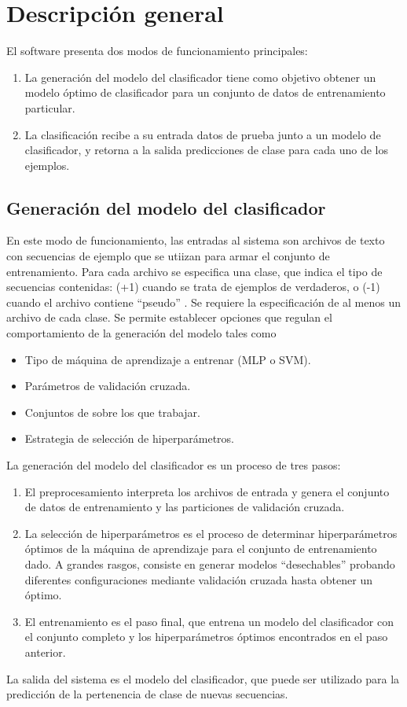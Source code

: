 %
%
%
\section{Descripción general}
%
El software presenta dos modos de funcionamiento principales:
%
\begin{enumerate}
\item
  La generación del modelo del clasificador tiene como objetivo
  obtener un modelo óptimo de clasificador para un conjunto de datos
  de entrenamiento particular.
\item
  La clasificación recibe a su entrada datos de prueba junto a un
  modelo de clasificador, y retorna a la salida predicciones de clase
  para cada uno de los ejemplos.
\end{enumerate}
%
%
%
\subsection{Generación del modelo del clasificador}
%
En este modo de funcionamiento, las entradas al sistema son archivos
de texto con secuencias de ejemplo que se utiizan para armar el
conjunto de entrenamiento.
Para cada archivo se especifica una clase, que indica
el tipo de secuencias contenidas:  (+1) cuando se trata de
ejemplos de  verdaderos, o  (-1) cuando el
archivo contiene ``pseudo'' .
Se requiere la especificación de al menos un archivo de cada clase.
Se permite establecer opciones que regulan el comportamiento de la
generación del modelo tales como
%
\begin{itemize}
\item Tipo de máquina de aprendizaje a entrenar (MLP o SVM).
\item Parámetros de validación cruzada.
\item Conjuntos de  sobre los que trabajar.
\item Estrategia de selección de hiperparámetros.
\end{itemize}
%

La generación del modelo del clasificador es un proceso de tres pasos:
%
\begin{enumerate}
\item El preprocesamiento interpreta los archivos de entrada y
  genera el conjunto de datos de entrenamiento y las particiones de
  validación cruzada.
\item La selección de hiperparámetros es el proceso de determinar
  hiperparámetros óptimos de la máquina de aprendizaje para
  el conjunto de entrenamiento dado. A grandes rasgos, consiste en
  generar modelos ``desechables'' probando diferentes configuraciones
  mediante validación cruzada hasta obtener un óptimo.
\item El entrenamiento es el paso final, que entrena un modelo del
  clasificador con el conjunto completo y los hiperparámetros
  óptimos encontrados en el paso anterior.
\end{enumerate}
%
La salida del sistema es el modelo del clasificador, que
puede ser utilizado para la predicción de la pertenencia de clase de
nuevas secuencias.
%
%
